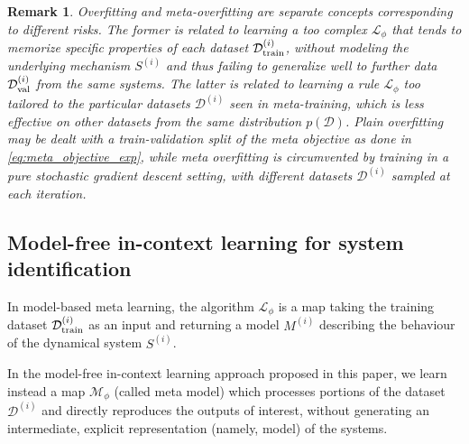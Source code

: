\documentclass{article}
\newcommand{\sys}{S}
\newcommand{\learn}{\mathcal{L}}
\newcommand{\free}{\mathcal{M}}
\newcommand{\D}{\mathcal{D}}
\newtheorem{remark}{Remark}%
\begin{document}
\begin{remark}
Overfitting and meta-overfitting are separate concepts corresponding to different risks. The former is related to learning a too complex $\learn_\phi$ that tends to memorize specific properties of each dataset $\D^{(i)}_{\rm train}$, without modeling the underlying mechanism $\sys^{(i)}$ and thus failing to generalize well to further data $\D^{(i)}_{\rm val}$ from the same systems.
The latter is related to learning a rule $\learn_\phi$ too tailored to the particular datasets $\D^{(i)}$ seen in meta-training, which is less effective on other datasets from the same distribution $p(\D)$. 
Plain overfitting  may be dealt with a train-validation split of the meta objective as done in \eqref{eq:meta_objective_exp}, while meta overfitting is circumvented by training in a pure stochastic gradient descent setting, with different datasets $\D^{(i)}$ sampled at each iteration. 
\end{remark}






\subsection{Model-free in-context learning for system identification}
\label{sec:model_free_model_based}
In model-based meta learning, the algorithm $\learn_\phi$ is a map taking the training dataset $\D^{(i)}_{\rm train}$ as an input and returning  a model $M^{(i)}$ describing the behaviour of the dynamical  system $\sys^{(i)}$. 
%  


In the model-free in-context  learning approach proposed in this paper, we learn instead a map $\free_{\phi}$ (called meta model) which processes  portions of the dataset $\D^{(i)}$ and directly reproduces the outputs  of interest, without generating an intermediate, explicit representation (namely, model) of the systems. 
%
\end{document}
